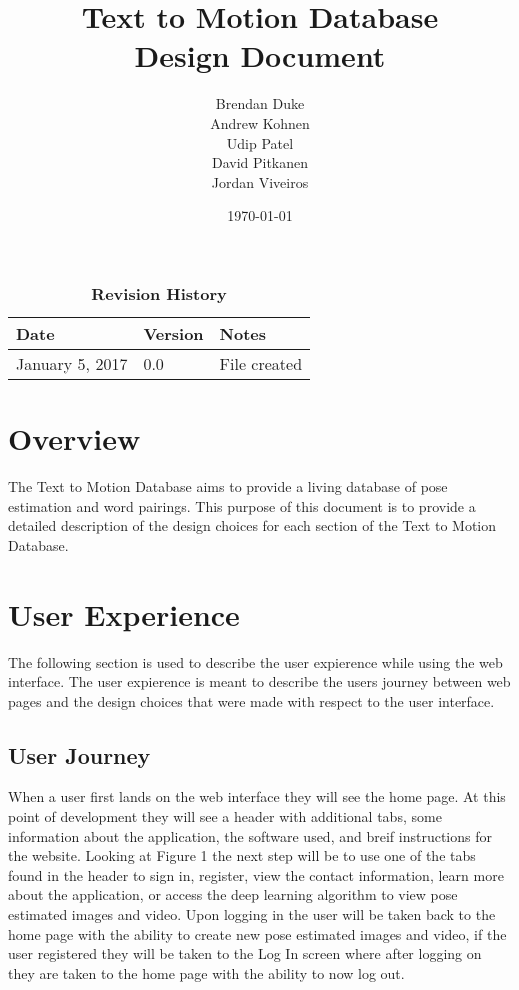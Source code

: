 \documentclass{scrreprt}
\begin{document}
\title{\bf Text to Motion Database\\[\baselineskip]\Large Design Document}
\author{Brendan Duke\\Andrew Kohnen\\Udip Patel\\David Pitkanen\\Jordan Viveiros}
\date{\today}
	
\maketitle

\tableofcontents


\begin{table}[bp]
\caption*{\bf Revision History}
\begin{tabularx}{\textwidth}{p{3.5cm}p{2cm}X}
\toprule {\bf Date} & {\bf Version} & {\bf Notes}\\
\midrule
January 5, 2017 & 0.0 & File created\\
\bottomrule
\end{tabularx}
\end{table}

\newpage


\chapter{Overview}
The Text to Motion Database aims to provide a living database of pose estimation and word pairings. This purpose of this document is to provide a detailed description of the design choices for each section of the Text to Motion Database. 

\chapter{User Experience}
The following section is used to describe the user expierence while using the web interface. The user expierence is meant to describe the users journey between web pages and the design choices that were made with respect to the user interface.

\section{User Journey}
When a user first lands on the web interface they will see the home page. At this point of development they will see a header with additional tabs, some information about the application, the software used, and breif instructions for the website. Looking at Figure 1 the next step will be to use one of the tabs found in the header to sign in, register, view the contact information, learn more about the application, or access the deep learning algorithm to view pose estimated images and video. Upon logging in the user will be taken back to the home page with the ability to create new pose estimated images and video, if the user registered they will be taken to the Log In screen where after logging on they are taken to the home page with the ability to now log out.
\end{document}

